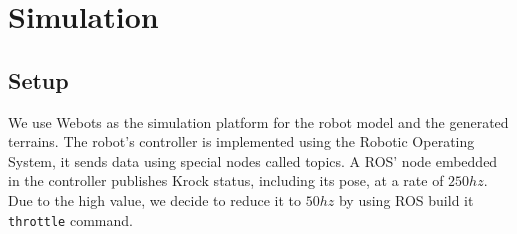 \documentclass[../document.tex]{subfiles}
\begin{document}


\section{Simulation}
\subsection{Setup}
We use Webots as the simulation platform for the robot model and the generated terrains. The robot's controller is implemented using the Robotic Operating System, it sends data using special nodes called topics. A ROS' node embedded in the controller publishes Krock status, including its pose, at a rate of $250hz$. Due to the high value, we decide to reduce it to $50hz$ by using ROS build it \texttt{throttle} command. 
\end{document}
